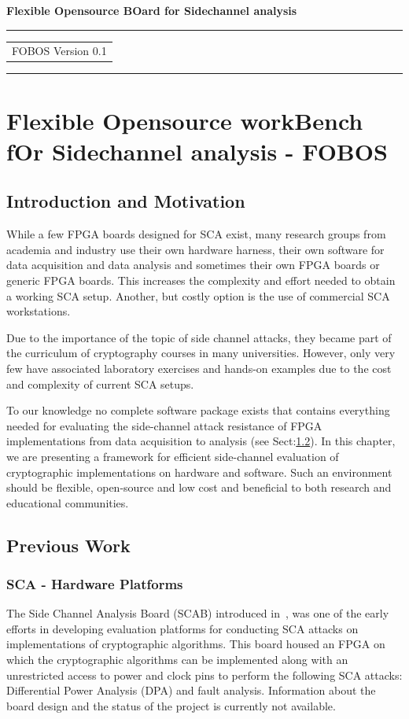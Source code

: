 \documentclass{llncs}
\numberwithin{algorithm}{chapter}
\begin{document}
%
\begin{flushleft}
\LARGE\bfseries Flexible Opensource BOard for
Sidechannel analysis 
\end{flushleft}
\rule{\textwidth}{1pt}
\vspace{2pt}
\begin{flushright}
\Huge
\begin{tabular}{@{}l}
FOBOS
{\Large Version 0.1}
\end{tabular}
\end{flushright}
\rule{\textwidth}{1pt}
\vfill
%
\newpage
\tableofcontents
\newpage
\section{Flexible Opensource workBench fOr Sidechannel analysis - FOBOS}
\minitoc
\subsection{Introduction and Motivation}

While a few FPGA boards designed for SCA exist, many research groups from academia and
industry use their own hardware harness, their own software for data acquisition and data analysis
and sometimes their own FPGA boards or generic FPGA boards. This increases the complexity and
effort needed to obtain a working SCA setup. Another, but costly option is the use of
commercial SCA workstations.

Due to the importance of the topic of side channel attacks, they became part of 
the curriculum of cryptography courses in many universities. However, only very few have 
associated laboratory exercises and hands-on examples due to the cost and complexity
of current SCA setups. 

To our knowledge no complete software package exists that contains everything needed
for evaluating the side-channel attack resistance of FPGA implementations from 
data acquisition to analysis (see Sect:\ref{sec:previous}). In this chapter, we are presenting a 
framework
for efficient side-channel evaluation of cryptographic implementations on hardware and software. 
Such an environment should be flexible, open-source and low cost and beneficial to both
research and educational communities.


\subsection{Previous Work}\label{sec:previous}
\subsubsection{SCA - Hardware Platforms}\label{sec:SCAhw}
The Side Channel Analysis Board (SCAB) introduced in~\cite{2021}, was one of the early efforts in
developing evaluation platforms for conducting SCA attacks on implementations of cryptographic algorithms.
This board housed an FPGA on which the cryptographic algorithms can be implemented along with an unrestricted
access to power and clock pins to perform the following SCA attacks: 
Differential Power Analysis (DPA) and fault analysis. Information about the board design 
and the status of the project is currently not available.
\end{document}
